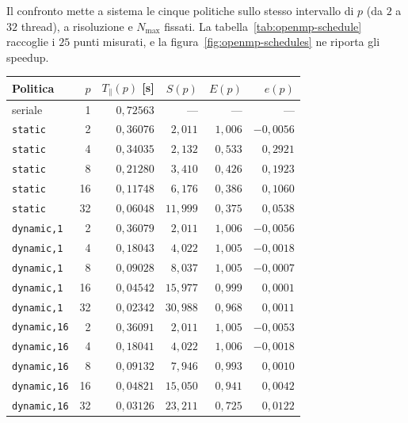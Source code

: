 Il confronto mette a sistema le cinque politiche sullo stesso intervallo di $p$
(da $2$ a $32$ thread), a risoluzione e $N_{\max}$ fissati. La
tabella~\ref{tab:openmp-schedule} raccoglie i $25$ punti misurati, e la
figura~\ref{fig:openmp-schedules} ne riporta gli speedup.
\vspace{2,5mm}
\begin{table}[htbp]
    \centering
    \begin{tabular}{lrrrrr}
        \hline
        Politica & $p$ & $T_\parallel(p)$ [s] & $S(p)$ & $E(p)$ & $e(p)$ \\
        \hline
        seriale & 1 & $0{,}72563$ & --- & --- & --- \\
        \hline
        \texttt{static} & 2  & $0{,}36076$ & $2{,}011$  & $1{,}006$ & $-0{,}0056$ \\
        \texttt{static} & 4  & $0{,}34035$ & $2{,}132$  & $0{,}533$ & $0{,}2921$ \\
        \texttt{static} & 8  & $0{,}21280$ & $3{,}410$  & $0{,}426$ & $0{,}1923$ \\
        \texttt{static} & 16 & $0{,}11748$ & $6{,}176$  & $0{,}386$ & $0{,}1060$ \\
        \texttt{static} & 32 & $0{,}06048$ & $11{,}999$ & $0{,}375$ & $0{,}0538$ \\
        \hline
        \texttt{dynamic,1} & 2  & $0{,}36079$ & $2{,}011$  & $1{,}006$ & $-0{,}0056$ \\
        \texttt{dynamic,1} & 4  & $0{,}18043$ & $4{,}022$  & $1{,}005$ & $-0{,}0018$ \\
        \texttt{dynamic,1} & 8  & $0{,}09028$ & $8{,}037$  & $1{,}005$ & $-0{,}0007$ \\
        \texttt{dynamic,1} & 16 & $0{,}04542$ & $15{,}977$ & $0{,}999$ & $0{,}0001$ \\
        \texttt{dynamic,1} & 32 & $0{,}02342$ & $30{,}988$ & $0{,}968$ & $0{,}0011$ \\
        \hline
        \texttt{dynamic,16} & 2  & $0{,}36091$ & $2{,}011$  & $1{,}005$ & $-0{,}0053$ \\
        \texttt{dynamic,16} & 4  & $0{,}18041$ & $4{,}022$  & $1{,}006$ & $-0{,}0018$ \\
        \texttt{dynamic,16} & 8  & $0{,}09132$ & $7{,}946$  & $0{,}993$ & $0{,}0010$ \\
        \texttt{dynamic,16} & 16 & $0{,}04821$ & $15{,}050$ & $0{,}941$ & $0{,}0042$ \\
        \texttt{dynamic,16} & 32 & $0{,}03126$ & $23{,}211$ & $0{,}725$ & $0{,}0122$ \\

\end{tabular}
\end{table}
